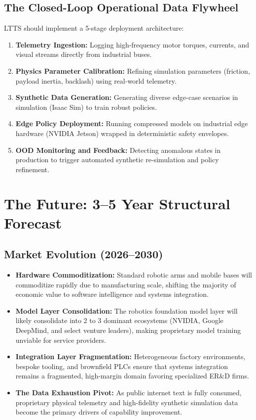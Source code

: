 \documentclass[11pt,a4paper]{article}
\begin{document}
\subsection{The Closed-Loop Operational Data Flywheel}
LTTS should implement a 5-stage deployment architecture:
\begin{enumerate}
    \item \textbf{Telemetry Ingestion:} Logging high-frequency motor torques, currents, and visual streams directly from industrial buses.
    \item \textbf{Physics Parameter Calibration:} Refining simulation parameters (friction, payload inertia, backlash) using real-world telemetry.
    \item \textbf{Synthetic Data Generation:} Generating diverse edge-case scenarios in simulation (Isaac Sim) to train robust policies.
    \item \textbf{Edge Policy Deployment:} Running compressed models on industrial edge hardware (NVIDIA Jetson) wrapped in deterministic safety envelopes.
    \item \textbf{OOD Monitoring and Feedback:} Detecting anomalous states in production to trigger automated synthetic re-simulation and policy refinement.
\end{enumerate}

\section{The Future: 3--5 Year Structural Forecast}

\subsection{Market Evolution (2026--2030)}
\begin{itemize}
    \item \textbf{Hardware Commoditization:} Standard robotic arms and mobile bases will commoditize rapidly due to manufacturing scale, shifting the majority of economic value to software intelligence and systems integration.
    \item \textbf{Model Layer Consolidation:} The robotics foundation model layer will likely consolidate into 2 to 3 dominant ecosystems (NVIDIA, Google DeepMind, and select venture leaders), making proprietary model training unviable for service providers.
    \item \textbf{Integration Layer Fragmentation:} Heterogeneous factory environments, bespoke tooling, and brownfield PLCs ensure that systems integration remains a fragmented, high-margin domain favoring specialized ER\&D firms.
    \item \textbf{The Data Exhaustion Pivot:} As public internet text is fully consumed, proprietary physical telemetry and high-fidelity synthetic simulation data become the primary drivers of capability improvement.
\end{itemize}
\end{document}

